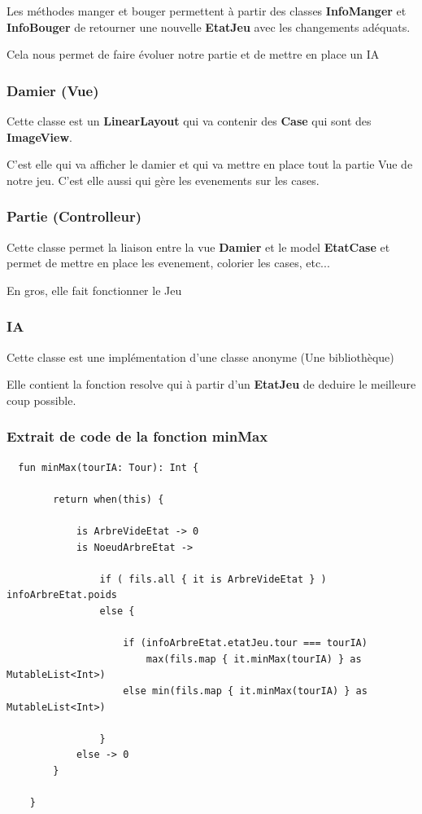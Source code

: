 \documentclass{article}
\begin{document}
  Les méthodes manger et bouger permettent à partir des classes 
  \textbf{InfoManger} et \textbf{InfoBouger} de retourner une nouvelle \textbf{EtatJeu} avec les 
  changements adéquats.

  Cela nous permet de faire évoluer notre partie et de mettre en place un IA
  
  \subsubsection{Damier (Vue)}
  
  Cette classe est un \textbf{LinearLayout} qui va contenir des \textbf{Case} 
  qui sont des \textbf{ImageView}.

  C'est elle qui va afficher le damier et qui va mettre en place tout la partie Vue 
  de notre jeu. 
  C'est elle aussi qui gère les evenements sur les cases.

  \subsubsection{Partie (Controlleur)}
  
  Cette classe permet la liaison entre la vue \textbf{Damier} et le model \textbf{EtatCase}
  et permet de mettre en place les evenement, colorier les cases, etc... 

  En gros, elle fait fonctionner le Jeu

  \subsubsection{IA}

  Cette classe est une implémentation d'une classe anonyme (Une bibliothèque)

  Elle contient la fonction resolve qui à partir d'un \textbf{EtatJeu} 
  de deduire le meilleure coup possible.

\subsubsection{Extrait de code de la fonction minMax}

\begin{verbatim}
  fun minMax(tourIA: Tour): Int {

        return when(this) {

            is ArbreVideEtat -> 0
            is NoeudArbreEtat ->

                if ( fils.all { it is ArbreVideEtat } ) infoArbreEtat.poids
                else {

                    if (infoArbreEtat.etatJeu.tour === tourIA) 
                        max(fils.map { it.minMax(tourIA) } as MutableList<Int>)
                    else min(fils.map { it.minMax(tourIA) } as MutableList<Int>)

                }
            else -> 0
        }

    }

\end{verbatim}
\end{document}
